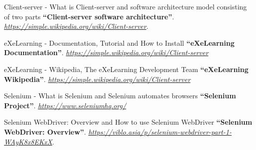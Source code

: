 \begin{thebibliography}{9}
\bibitem{}
Client-server - What is Client-server and software architecture model consisting of two parts
\textbf{“Client-server software architecture”}.
\textit{\href{https://simple.wikipedia.org/wiki/Client-server}{https://simple.wikipedia.org/wiki/Client-server}}.

\bibitem{}
eXeLearning - Documentation, Tutorial and How to Install
\textbf{“eXeLearning Documentation”}.
\textit{\href{https://simple.wikipedia.org/wiki/Client-server}{https://simple.wikipedia.org/wiki/Client-server}}

\bibitem{}
eXeLearning - Wikipedia, The eXeLearning Development Team
\textbf{“eXeLearning Wikipedia”}.
\textit{\href{https://simple.wikipedia.org/wiki/Client-server}{https://simple.wikipedia.org/wiki/Client-server}}


\bibitem{}
Selenium - What is Selenium and Selenium automates browsers
\textbf{“Selenium Project”}.
\textit{\href{https://www.seleniumhq.org/}{https://www.seleniumhq.org/}}


\bibitem{}
Selenium WebDriver: Overview and How to use Selenium WebDriver
\textbf{“Selenium WebDriver: Overview”}.
\textit{\href{https://viblo.asia/p/selenium-webdriver-part-1-WAyK8x8EKxX}{https://viblo.asia/p/selenium-webdriver-part-1-WAyK8x8EKxX}}.

\end{thebibliography}


